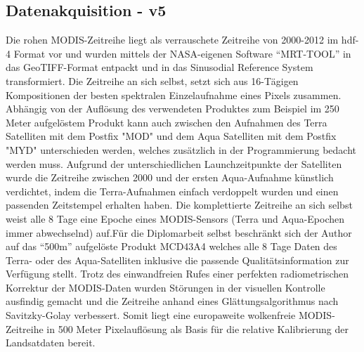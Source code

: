 \documentclass[11pt]{report}
\begin{document}
\subsection{Datenakquisition - v5}
Die  rohen MODIS-Zeitreihe liegt als verrauschete Zeitreihe von 2000-2012 im hdf-4 Format vor und  wurden mittels der NASA-eigenen Software "`MRT-TOOL"' in das GeoTIFF-Format entpackt und in das Sinusodial Reference System transformiert. Die Zeitreihe an sich selbst, setzt sich aus 16-Tägigen Kompositionen der besten spektralen Einzelaufnahme eines Pixels zusammen. Abhängig von der Auflösung des verwendeten Produktes zum Beispiel im 250 Meter aufgelöstem Produkt kann auch zwischen den Aufnahmen des Terra Satelliten mit dem Postfix "MOD" und dem Aqua Satelliten mit dem Postfix "MYD" unterschieden werden, welches zusätzlich in der Programmierung bedacht werden muss. Aufgrund der unterschiedlichen Launchzeitpunkte der Satelliten wurde die Zeitreihe zwischen 2000 und der ersten Aqua-Aufnahme künstlich verdichtet, indem die Terra-Aufnahmen einfach verdoppelt wurden und einen passenden Zeitstempel erhalten haben. Die komplettierte Zeitreihe an sich selbst weist alle 8 Tage eine Epoche eines MODIS-Sensors (Terra und Aqua-Epochen immer abwechselnd) auf.Für die Diplomarbeit selbst beschränkt sich der Author auf das "`500m"' aufgelöste Produkt MCD43A4 welches alle 8 Tage Daten des Terra- oder des Aqua-Satelliten inklusive die passende Qualitätsinformation zur Verfügung stellt. 
Trotz des einwandfreien Rufes einer perfekten radiometrischen Korrektur der MODIS-Daten wurden Störungen in der visuellen Kontrolle ausfindig gemacht und die Zeitreihe anhand eines Glättungsalgorithmus nach Savitzky-Golay verbessert. Somit liegt eine europaweite wolkenfreie MODIS-Zeitreihe in 500 Meter Pixelauflösung als Basis für die relative Kalibrierung der Landsatdaten bereit.
\end{document}
